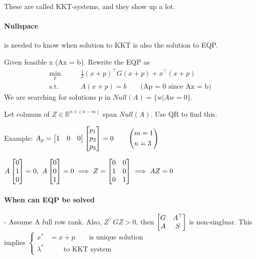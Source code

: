 \documentclass{article}
\begin{document}
These are called KKT-systems, and they show up a lot. 

\paragraph{Nullspace} is needed to know when solution to KKT is also the solution to EQP. 

\medskip Given feasible x (Ax = b). Rewrite the EQP as
\begin{align*}
  \min_p \qquad& \frac{1}{2}(x+p)^{\top}G(x+p) + x^{\top}(x+p)  \\ 
  \text{s.t.} \qquad& A(x+p) = b \qquad \text{(Ap = 0 since Ax = b)}
\end{align*}
We are searching for solutions p in $Null(A) = \{w | Aw = 0\}$. 

\medskip Let columns of $Z\in \mathbb{R}^{n\times (n-m)}$ span $Null(A)$. Use QR to find this. 

\medskip Example: $A_p = \begin{bmatrix} 1 & 0 & 0 \end{bmatrix}\begin{bmatrix} p_1 \\ p_2 \\ p_3 \end{bmatrix}= 0 \qquad 
\left(
  \begin{aligned}
    &m = 1  \\ 
    &n = 3
  \end{aligned}
\right)$

$A\begin{bmatrix} 0 \\ 1 \\ 0 \end{bmatrix} = 0,\ A\begin{bmatrix} 0 \\ 0 \\ 1 \end{bmatrix} = 0 \implies Z = \begin{bmatrix} 0 & 0 \\ 1 & 0 \\ 0 & 1 \end{bmatrix} \implies AZ = 0$

\paragraph{When can EQP be solved}- Assume A full row rank. Also, $Z^{\top}GZ > 0$, then $\begin{bmatrix} G & A^{\top} \\ A & S \end{bmatrix}$ is non-singluar. This implies $\left\{
  \begin{aligned}
    x^*& = x+p \qquad \text{is unique solution}  \\ 
    \lambda^*& \qquad \text{to KKT system} 
  \end{aligned}
\right.$

\end{document}
